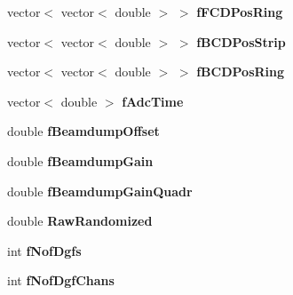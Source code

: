 \begin{DoxyCompactItemize}
\item 
\hypertarget{class_calibration_ac2f692c5e54aed9d508e63db2439855f}{vector$<$ vector$<$ double $>$ $>$ {\bfseries f\-F\-C\-D\-Pos\-Ring}}\label{class_calibration_ac2f692c5e54aed9d508e63db2439855f}

\item 
\hypertarget{class_calibration_a3a011b25d22e065da7cc0e758dc73d63}{vector$<$ vector$<$ double $>$ $>$ {\bfseries f\-B\-C\-D\-Pos\-Strip}}\label{class_calibration_a3a011b25d22e065da7cc0e758dc73d63}

\item 
\hypertarget{class_calibration_a76aaf9355d2e29501ddc97028d9cb02a}{vector$<$ vector$<$ double $>$ $>$ {\bfseries f\-B\-C\-D\-Pos\-Ring}}\label{class_calibration_a76aaf9355d2e29501ddc97028d9cb02a}

\item 
\hypertarget{class_calibration_ad17489696497c9913e8fed070988fa28}{vector$<$ double $>$ {\bfseries f\-Adc\-Time}}\label{class_calibration_ad17489696497c9913e8fed070988fa28}

\item 
\hypertarget{class_calibration_abecda979659e8f0a7768f9969fb143fe}{double {\bfseries f\-Beamdump\-Offset}}\label{class_calibration_abecda979659e8f0a7768f9969fb143fe}

\item 
\hypertarget{class_calibration_ad9811871b4b5c8b602cf927420a73f67}{double {\bfseries f\-Beamdump\-Gain}}\label{class_calibration_ad9811871b4b5c8b602cf927420a73f67}

\item 
\hypertarget{class_calibration_ad3621735f248e801440ee267478ac300}{double {\bfseries f\-Beamdump\-Gain\-Quadr}}\label{class_calibration_ad3621735f248e801440ee267478ac300}

\item 
\hypertarget{class_calibration_aefdfefa1d8aaf1dd0dc4119566f44b79}{double {\bfseries Raw\-Randomized}}\label{class_calibration_aefdfefa1d8aaf1dd0dc4119566f44b79}

\item 
\hypertarget{class_calibration_a19434507a5b8bbc2cdde3f0b6b4889c7}{int {\bfseries f\-Nof\-Dgfs}}\label{class_calibration_a19434507a5b8bbc2cdde3f0b6b4889c7}

\item 
\hypertarget{class_calibration_af9fcd69a29bc601ccc864105ed805c2e}{int {\bfseries f\-Nof\-Dgf\-Chans}}\label{class_calibration_af9fcd69a29bc601ccc864105ed805c2e}


\end{DoxyCompactItemize}
